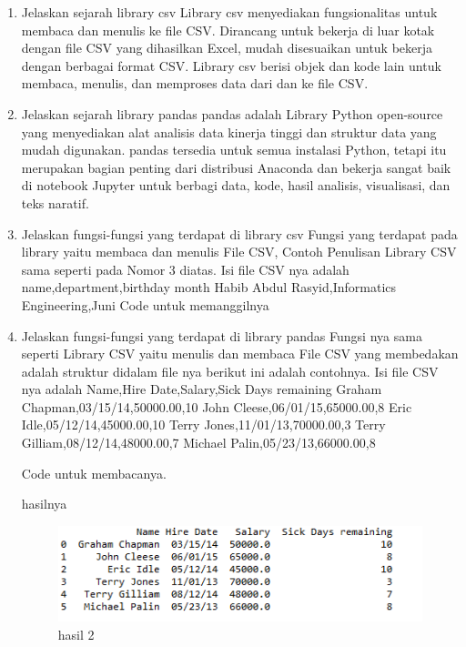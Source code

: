 \begin {enumerate}
\item Jelaskan sejarah library csv\newline 
Library csv menyediakan fungsionalitas untuk membaca dan menulis ke file CSV. Dirancang untuk bekerja di luar kotak dengan file CSV yang dihasilkan Excel, mudah disesuaikan untuk bekerja dengan berbagai format CSV. Library csv berisi objek dan kode lain untuk membaca, menulis, dan memproses data dari dan ke file CSV.
\item Jelaskan sejarah library pandas\newline 
pandas adalah Library Python open-source yang menyediakan alat analisis data kinerja tinggi dan struktur data yang mudah digunakan. pandas tersedia untuk semua instalasi Python, tetapi itu merupakan bagian penting dari distribusi Anaconda dan bekerja sangat baik di notebook Jupyter untuk berbagi data, kode, hasil analisis, visualisasi, dan teks naratif.
\item Jelaskan fungsi-fungsi yang terdapat di library csv\newline
Fungsi yang terdapat pada library yaitu membaca dan menulis File CSV, Contoh Penulisan Library CSV sama seperti pada Nomor 3 diatas.
Isi file CSV nya adalah \newline
name,department,birthday month\newline
Habib Abdul Rasyid,Informatics Engineering,Juni\newline
Code untuk memanggilnya \newline

	\item Jelaskan fungsi-fungsi yang terdapat di library pandas
Fungsi nya sama seperti Library CSV yaitu menulis dan membaca File CSV yang membedakan adalah struktur didalam file nya
berikut ini adalah contohnya.\newline
Isi file CSV nya adalah\newline
Name,Hire Date,Salary,Sick Days remaining\newline
Graham Chapman,03/15/14,50000.00,10\newline
John Cleese,06/01/15,65000.00,8\newline
Eric Idle,05/12/14,45000.00,10\newline
Terry Jones,11/01/13,70000.00,3\newline
Terry Gilliam,08/12/14,48000.00,7\newline
Michael Palin,05/23/13,66000.00,8\newline

Code untuk membacanya.

hasilnya
\begin{figure}[h]
\centering
\includegraphics[scale=0.5]{figures/habib/hasil2.png}
\caption{hasil 2}
\label{fig:csv}
\end{figure}


\end{enumerate}
